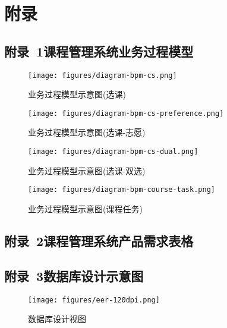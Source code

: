 \chapter*{附\qquad 录}

\section*{附录~1\quad	课程管理系统业务过程模型}
\label{sec:appendix-bpm}

\begin{figure}[!hbp]
  \begin{center}
    \texttt{[image: figures/diagram-bpm-cs.png]}
    \caption{业务过程模型示意图(选课)\label{BPMCourseRegister}}
  \end{center}
\end{figure}

\begin{figure}[!hbp]
  \begin{center}
    \texttt{[image: figures/diagram-bpm-cs-preference.png]}
    \caption{业务过程模型示意图(选课-志愿)\label{BPMCourseRegisterP}}
  \end{center}
\end{figure}

\begin{figure}[!hbp]
  \begin{center}
    \texttt{[image: figures/diagram-bpm-cs-dual.png]}
    \caption{业务过程模型示意图(选课-双选)\label{BPMCourseRegisterD}}
  \end{center}
\end{figure}

\begin{figure}[!hbp]
  \begin{center}
    \texttt{[image: figures/diagram-bpm-course-task.png]}
    \caption{业务过程模型示意图(课程任务)\label{BPMTask}}
  \end{center}
\end{figure}

\newpage

\section*{附录~2\quad	课程管理系统产品需求表格}
\label{sec:appendix-requirement-table}


\newpage

\section*{附录~3\quad	数据库设计示意图}
\label{sec:appendix-database-diagram}

\begin{figure}[!h]
  \begin{center}
    \texttt{[image: figures/eer-120dpi.png]}
    \caption{数据库设计视图\label{FullDatabaseDesign}}
  \end{center}
\end{figure}

